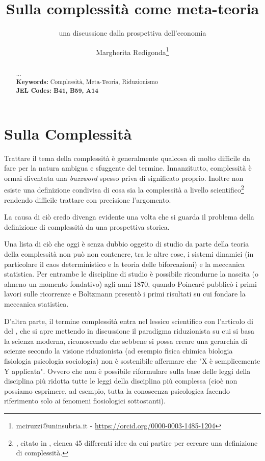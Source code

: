 \documentclass[a4paper, headings=standardclasses]{scrartcl}
\title{Sulla complessità come meta-teoria\let\thefootnote\relax\footnotetext{
		Versioni precedenti di questo lavoro sono state presentate alla 24esima ESHET Summer School e alla 2023 INEM Conference. \\
		L'ultima versione di questo lavoro è disponibile online \url{https://github.com/TnTo/complexity-economics/}.
}}
\subtitle{una discussione dalla prospettiva dell'economia}
\author{Margherita Redigonda\thanks{mciruzzi@uninsubria.it - \url{https://orcid.org/0000-0003-1485-1204}}}
\begin{document}
	
	\maketitle
	
	\begin{abstract}
		... \\
		\textbf{Keywords:} Complessità, Meta-Teoria, Riduzionismo\\
		\textbf{JEL Codes: B41, B59, A14}
	\end{abstract}
	
\section{Sulla Complessità}
Trattare il tema della complessità è generalmente qualcosa di molto difficile da fare per la natura ambigua e sfuggente del termine.
Innanzitutto, complessità è ormai diventata una \textit{buzzword} spesso priva di significato proprio.
Inoltre non esiste una definizione condivisa di cosa sia la complessità a livello scientifico\footnote{\textcite{horgan2015}, citato in \textcite{holt2011}, elenca 45 differenti idee da cui partire per cercare una definizione di complessità.} rendendo difficile trattare con precisione l'argomento.

La causa di ciò credo divenga evidente una volta che si guarda il problema della definizione di complessità da una prospettiva storica. 

Una lista di ciò che oggi è senza dubbio oggetto di studio da parte della teoria della complessità non può non contenere, tra le altre cose, i sistemi dinamici (in particolare il caos deterministico e la teoria delle biforcazioni) e la meccanica statistica. Per entrambe le discipline di studio è possibile ricondurne la nascita (o almeno un momento fondativo) agli anni 1870, quando Poincaré pubblicò i primi lavori sulle ricorrenze e Boltzmann presentò i primi risultati su cui fondare la meccanica statistica.

D'altra parte, il termine complessità entra nel lessico scientifico con l'articolo di \citeauthor{anderson1972} del \citeyear{anderson1972} , che si apre mettendo in discussione il paradigma riduzionista su cui si basa la scienza moderna, riconoscendo che sebbene si possa creare una gerarchia di scienze secondo la visione riduzionista (ad esempio fisica \textrightarrow{} chimica \textrightarrow{} biologia \textrightarrow{} fisiologia \textrightarrow{} psicologia \textrightarrow{} sociologia) non è sostenibile affermare che "X è semplicemente Y applicata".
Ovvero che non è possibile riformulare sulla base delle leggi della disciplina più ridotta tutte le leggi della disciplina più complessa (cioè non possiamo esprimere, ad esempio, tutta la conoscenza psicologica facendo riferimento solo ai fenomeni fiosiologici sottostanti).
\end{document}
